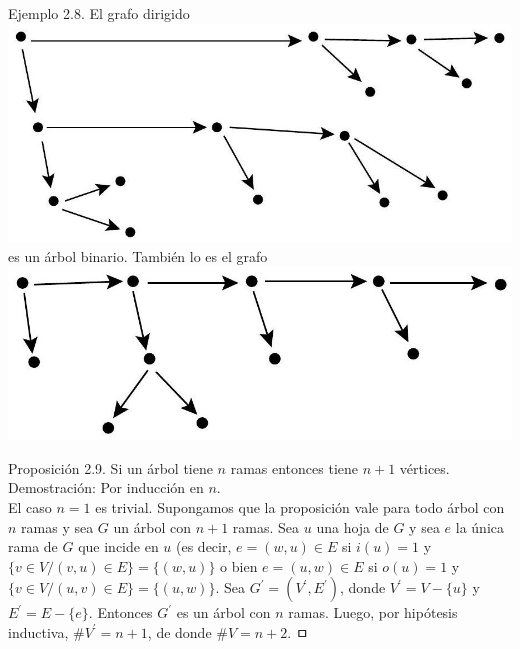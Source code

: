 \documentclass[10pt]{article}
\begin{document}
Ejemplo 2.8. El grafo dirigido\\
\includegraphics[max width=\textwidth, center]{2025_09_05_93c7c1835f249f70c0eeg-05}\\
es un árbol binario. También lo es el grafo\\
\includegraphics[max width=\textwidth, center]{2025_09_05_93c7c1835f249f70c0eeg-05(1)}

Proposición 2.9. Si un árbol tiene $n$ ramas entonces tiene $n+1$ vértices.\\
Demostración: Por inducción en $n$.\\
El caso $n=1$ es trivial. Supongamos que la proposición vale para todo árbol con $n$ ramas y sea $G$ un árbol con $n+1$ ramas. Sea $u$ una hoja de $G$ y sea $e$ la única rama de $G$ que incide en $u$ (es decir, $e=(w, u) \in E$ si $i(u)=1$ y $\{v \in V /(v, u) \in E\}=\{(w, u)\}$ o bien $e=(u, w) \in E$ si $o(u)=1$ y $\{v \in V /(u, v) \in E\}=\{(u, w)\}$. Sea $G^{\prime}=\left(V^{\prime}, E^{\prime}\right)$, donde $V^{\prime}=V-\{u\}$ y $E^{\prime}=E-\{e\}$. Entonces $G^{\prime}$ es un árbol con $n$ ramas. Luego, por hipótesis inductiva, $\# V^{\prime}=n+1$, de donde $\# V=n+2$. ㅁ
\end{document}
